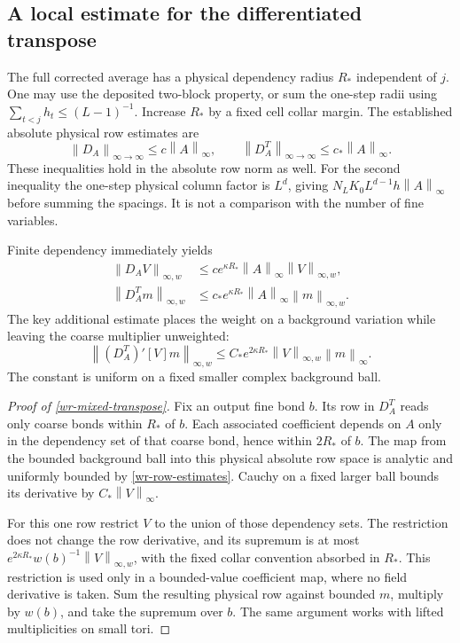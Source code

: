 \documentclass[11pt]{article}
\theoremstyle{remark}
\newcommand{\norm}[1]{\left\|#1\right\|}
\begin{document}
\subsection{A local estimate for the differentiated transpose}
\label{wr-local-transpose}

The full corrected average has a physical dependency radius
$R_*$ independent of $j$. One may use the deposited two-block
property, or sum the one-step radii using
$\sum_{t<j}h_t\le(L-1)^{-1}$. Increase $R_*$ by a fixed cell
collar margin. The established absolute physical row estimates are
\begin{equation}\label{wr-row-estimates}
 \norm{D_A}_{\infty\to\infty}\le c\norm{A}_\infty,
 \qquad
 \norm{D_A^T}_{\infty\to\infty}\le c_*\norm{A}_\infty.
\end{equation}
These inequalities hold in the absolute row norm as well.
For the second inequality the one-step physical column factor
is $L^d$, giving
$N_LK_0L^{d-1}h\norm{A}_\infty$ before summing the spacings.
It is not a comparison with the number of fine variables.

Finite dependency immediately yields
\begin{equation}\label{wr-weighted-rows}
 \begin{split}
 \norm{D_AV}_{\infty,w}
 &\le ce^{\kappa R_*}\norm{A}_\infty\norm{V}_{\infty,w},\\
 \norm{D_A^Tm}_{\infty,w}
 &\le c_*e^{\kappa R_*}\norm{A}_\infty\norm{m}_{\infty,w}.
 \end{split}
\end{equation}
The key additional estimate places the weight on a background
variation while leaving the coarse multiplier unweighted:
\begin{equation}\label{wr-mixed-transpose}
 \boxed{\quad
 \norm{(D_A^T)'[V]m}_{\infty,w}
 \le C_*e^{2\kappa R_*}\norm{V}_{\infty,w}\norm{m}_\infty.
 \quad}
\end{equation}
The constant is uniform on a fixed smaller complex background
ball.

\begin{proof}[Proof of \eqref{wr-mixed-transpose}]
Fix an output fine bond $b$. Its row in $D_A^T$ reads only coarse
bonds within $R_*$ of $b$. Each associated coefficient depends on
$A$ only in the dependency set of that coarse bond, hence within
$2R_*$ of $b$. The map from the bounded background ball into this
physical absolute row space is analytic and uniformly bounded
by \eqref{wr-row-estimates}. Cauchy on a fixed larger ball bounds
its derivative by $C_*\norm{V}_\infty$.

For this one row restrict $V$ to the union of those dependency
sets. The restriction does not change the row derivative, and its
supremum is at most
$e^{2\kappa R_*}w(b)^{-1}\norm{V}_{\infty,w}$, with the fixed
collar convention absorbed in $R_*$. This restriction is used
only in a bounded-value coefficient map, where no field derivative
is taken. Sum the resulting physical row against bounded $m$,
multiply by $w(b)$, and take the supremum over $b$.
The same argument works with lifted multiplicities on small tori.
\end{proof}
\end{document}
